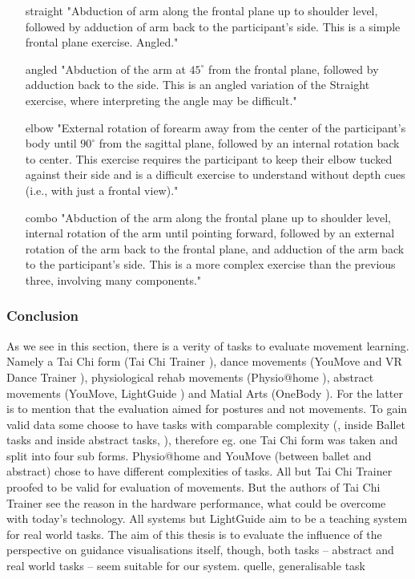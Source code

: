 \begin{itemize}
	\item[straight] "Abduction of arm along the frontal plane up to shoulder level, followed by adduction of arm back to the participant’s side. This is a simple frontal plane exercise.
	Angled."
	\item[angled] "Abduction of the arm at $45^\circ$ from the frontal plane, followed by adduction back to the side. This is an angled variation of the Straight exercise, where interpreting the angle may be difficult."
	\item[elbow] "External rotation of forearm away from the center of the participant’s body until $90^\circ$ from the sagittal plane, followed by an internal rotation back to center. This exercise requires the participant to keep their elbow tucked against their side and is a difficult exercise to understand without depth cues (i.e., with just a frontal view)."
	\item[combo] "Abduction of the arm along the frontal plane up to shoulder level, internal rotation of the arm until pointing forward, followed by an external rotation of the arm back to the frontal plane, and adduction of the arm back to the participant’s side. This is a more complex exercise than the previous three, involving many components."
\end{itemize}

\subsubsection{Conclusion}
As we see in this section, there is a verity of tasks to evaluate movement learning. Namely a Tai Chi form (Tai Chi Trainer \cite{Chua2003}), dance movements (YouMove \cite{Anderson2013a} and VR Dance Trainer \cite{Chan2011a}), physiological rehab movements (Physio@home \cite{Tang2015}), abstract movements (YouMove, LightGuide \cite{Sodhi2012}) and Matial Arts (OneBody \cite{Hoang2016}). For the latter is to mention that the evaluation aimed for postures and not movements. To gain valid data some choose to have tasks with comparable complexity (\cite{Chua2003}, \cite{Anderson2013a} inside Ballet tasks and inside abstract tasks, \cite{Sodhi2012}), therefore eg. one Tai Chi form was taken and split into four sub forms. Physio@home and YouMove (between ballet and abstract) chose to have different complexities of tasks. All but Tai Chi Trainer proofed to be valid for evaluation of movements. But the authors of Tai Chi Trainer see the reason in the hardware performance, what could be overcome with today's technology. All systems but LightGuide aim to be a teaching system for real world tasks. The aim of this thesis is to evaluate the influence of the perspective on guidance visualisations itself, though, both tasks \--- abstract and real world tasks \--- seem suitable for our system. 
\todo quelle, generalisable task


